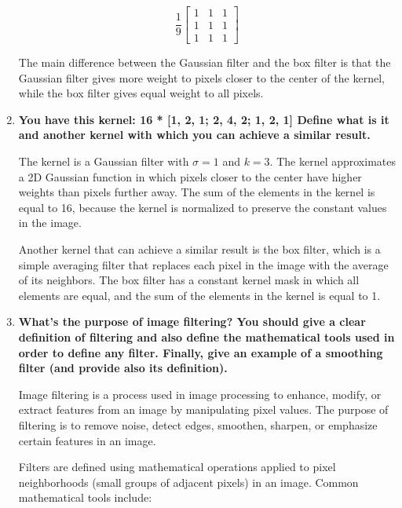 \documentclass[12pt]{article}
\begin{document}
\begin{enumerate}
          \[\frac{1}{9}
              \begin{bmatrix}
                  1 & 1 & 1 \\
                  1 & 1 & 1 \\
                  1 & 1 & 1
              \end{bmatrix}
          \]

          The main difference between the Gaussian filter and the box filter is that the Gaussian filter gives more weight to pixels closer to the center of the kernel, while the box filter gives equal weight to all pixels.

    \item \textbf{You have this kernel:     16 * [1, 2, 1; 2, 4, 2; 1, 2, 1]
              Define what is it and another kernel with which you can achieve a similar result.}

          The kernel is a Gaussian filter with $\sigma = 1$ and $k = 3$.
          The kernel approximates a 2D Gaussian function in which pixels closer to the center have higher weights than pixels further away.
          The sum of the elements in the kernel is equal to 16, because the kernel is normalized to preserve the constant values in the image.

          Another kernel that can achieve a similar result is the box filter, which is a simple averaging filter that replaces each pixel in the image with the average of its neighbors.
          The box filter has a constant kernel mask in which all elements are equal, and the sum of the elements in the kernel is equal to 1.


    \item \textbf{What’s the purpose of image filtering?  You should give a clear definition of filtering and also define the mathematical tools used in order to define any filter.
              Finally, give an example of a smoothing filter (and provide also its definition).}


          Image filtering is a process used in image processing to enhance, modify, or extract features from an image by manipulating pixel values. The purpose of filtering is to remove noise, detect edges, smoothen, sharpen, or emphasize certain features in an image.

          Filters are defined using mathematical operations applied to pixel neighborhoods (small groups of adjacent pixels) in an image. Common mathematical tools include:


\end{enumerate}
\end{document}
